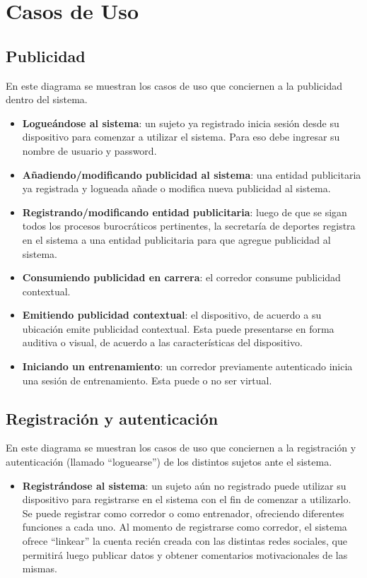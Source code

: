 \section{Casos de Uso}
\subsection{Publicidad}
En este diagrama se muestran los casos de uso que conciernen a la publicidad dentro del sistema.

\begin{itemize}
	\item \textbf{Logueándose al sistema}: un sujeto ya registrado inicia sesión desde su dispositivo para comenzar a utilizar el sistema. Para eso debe ingresar su nombre de usuario y password.
	\item \textbf{Añadiendo/modificando publicidad al sistema}: una entidad publicitaria ya registrada y logueada añade o modifica nueva publicidad al sistema.
	\item \textbf{Registrando/modificando entidad publicitaria}: luego de que se sigan todos los procesos burocráticos pertinentes, la secretaría de deportes registra en el sistema a una entidad publicitaria para que agregue publicidad al sistema.
	\item \textbf{Consumiendo publicidad en carrera}: el corredor consume publicidad contextual.
	\item \textbf{Emitiendo publicidad contextual}: el dispositivo, de acuerdo a su ubicación emite publicidad contextual. Esta puede presentarse en forma auditiva o visual, de acuerdo a las características del dispositivo.
	\item \textbf{Iniciando un entrenamiento}: un corredor previamente autenticado inicia una sesión de entrenamiento. Esta puede o no ser virtual.
\end{itemize}

\subsection{Registración y autenticación}
En este diagrama se muestran los casos de uso que conciernen a la registración y autenticación (llamado ``loguearse'') de los distintos sujetos ante el sistema. 

\begin{itemize}
	\item \textbf{Registrándose al sistema}: un sujeto aún no registrado puede utilizar su dispositivo para registrarse en el sistema con el fin de comenzar a utilizarlo. Se puede registrar como corredor o como entrenador, ofreciendo diferentes funciones a cada uno. Al momento de registrarse como corredor, el sistema ofrece ``linkear'' la cuenta recién creada con las distintas redes sociales, que permitirá luego publicar datos y obtener comentarios motivacionales de las mismas.
\end{itemize}


